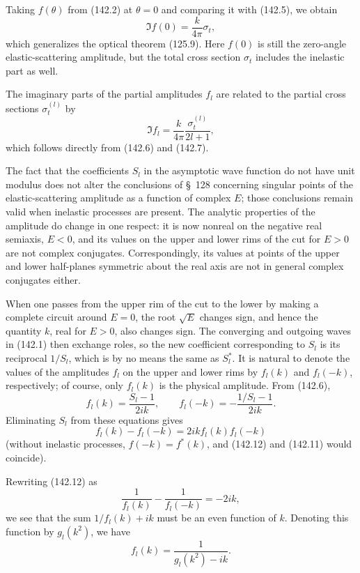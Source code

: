 Taking $f(\theta)$ from (142.2) at $\theta=0$ and comparing it with (142.5), we obtain
\begin{equation}
 \Im f(0)=\frac{k}{4\pi}\sigma_t,
 \tag{142.10}
\end{equation}
which generalizes the optical theorem (125.9). Here $f(0)$ is still the zero-angle elastic-scattering amplitude, but the total cross section $\sigma_t$ includes the inelastic part as well.

The imaginary parts of the partial amplitudes $f_l$ are related to the partial cross sections $\sigma_t^{(l)}$ by
\begin{equation}
 \Im f_l=\frac{k}{4\pi}\frac{\sigma_t^{(l)}}{2l+1},
 \tag{142.11}
\end{equation}
which follows directly from (142.6) and (142.7).

The fact that the coefficients $S_l$ in the asymptotic wave function do not have unit modulus does not alter the conclusions of §~128 concerning singular points of the elastic-scattering amplitude as a function of complex $E$; those conclusions remain valid when inelastic processes are present. The analytic properties of the amplitude do change in one respect: it is now nonreal on the negative real semiaxis, $E<0$, and its values on the upper and lower rims of the cut for $E>0$ are not complex conjugates. Correspondingly, its values at points of the upper and lower half-planes symmetric about the real axis are not in general complex conjugates either.

When one passes from the upper rim of the cut to the lower by making a complete circuit around $E=0$, the root $\sqrt E$ changes sign, and hence the quantity $k$, real for $E>0$, also changes sign. The converging and outgoing waves in (142.1) then exchange roles, so the new coefficient corresponding to $S_l$ is its reciprocal $1/S_l$, which is by no means the same as $S_l^*$. It is natural to denote the values of the amplitudes $f_l$ on the upper and lower rims by $f_l(k)$ and $f_l(-k)$, respectively; of course, only $f_l(k)$ is the physical amplitude. From (142.6),
\[
 f_l(k)=\frac{S_l-1}{2ik},\qquad
 f_l(-k)=-\frac{1/S_l-1}{2ik}.
\]
Eliminating $S_l$ from these equations gives
\begin{equation}
 f_l(k)-f_l(-k)=2ikf_l(k)f_l(-k)
 \tag{142.12}
\end{equation}
(without inelastic processes, $f(-k)=f^*(k)$, and (142.12) and (142.11) would coincide).

Rewriting (142.12) as
\[
 \frac1{f_l(k)}-\frac1{f_l(-k)}=-2ik,
\]
we see that the sum $1/f_l(k)+ik$ must be an even function of $k$. Denoting this function by $g_l(k^2)$, we have
\begin{equation}
 f_l(k)=\frac1{g_l(k^2)-ik}.
 \tag{142.13}
\end{equation}

